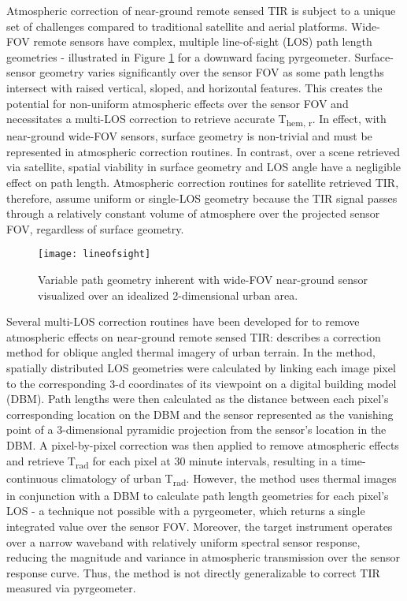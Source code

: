 
Atmospheric correction of near-ground remote sensed TIR is subject to a unique set of challenges compared to traditional satellite and aerial platforms. Wide-FOV remote sensors have complex, multiple line-of-sight (LOS) path length geometries - illustrated in Figure \ref{lineofsight} for a downward facing pyrgeometer. Surface-sensor geometry varies significantly over the sensor FOV as some path lengths intersect with raised vertical, sloped, and horizontal features. This creates the potential for non-uniform atmospheric effects over the sensor FOV and necessitates a multi-LOS correction to retrieve accurate T\textsubscript{hem, r}. In effect, with near-ground wide-FOV sensors, surface geometry is non-trivial and must be represented in atmospheric correction routines. In contrast, over a scene retrieved via satellite, spatial viability in surface geometry and LOS angle have a negligible effect on path length. Atmospheric correction routines for satellite retrieved TIR, therefore, assume uniform or single-LOS geometry because the TIR signal passes through a relatively constant volume of atmosphere over the projected sensor FOV, regardless of surface geometry.

\begin{figure}[H]
	\texttt{[image: lineofsight]}
	\caption{Variable path geometry inherent with wide-FOV near-ground sensor visualized over an idealized 2-dimensional urban area.}
	\label{lineofsight}
\end{figure}

Several multi-LOS correction routines have been developed for to remove atmospheric effects on near-ground remote sensed TIR: \citet{Meier2011} describes a correction method for oblique angled thermal imagery of urban terrain. In the method, spatially distributed LOS geometries were calculated by linking each image pixel to the corresponding 3-d coordinates of its viewpoint on a digital building model (DBM). Path lengths were then calculated as the distance between each pixel's corresponding location on the DBM and the sensor represented as the vanishing point of a 3-dimensional pyramidic projection from the sensor's location in the DBM. A pixel-by-pixel correction was then applied to remove atmospheric effects and retrieve T\textsubscript{rad} for each pixel at 30 minute intervals, resulting in a time-continuous climatology of urban T\textsubscript{rad}. However, the method uses thermal images in conjunction with a DBM to calculate path length geometries for each pixel's LOS - a technique not possible with a pyrgeometer, which returns a single integrated value over the sensor FOV. Moreover, the target instrument operates over a narrow waveband with relatively uniform spectral sensor response, reducing the magnitude and variance in atmospheric transmission over the sensor response curve. Thus, the method is not directly generalizable to correct TIR measured via pyrgeometer.

